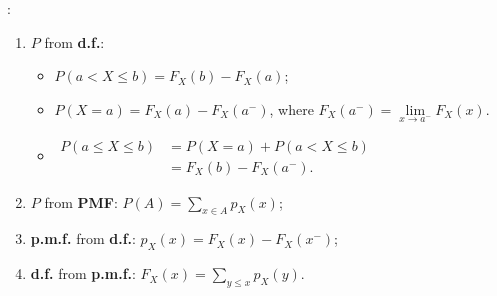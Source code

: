 :
\begin{enumerate}
  \item \(P\) from \textbf{d.f.}:
  \begin{itemize}
    \item \(P(a<X\leq b)=F_X(b) - F_X(a)\);
    \item \(P(X=a)=F_X(a)-F_X(a^-)\), where 
      \(F_X(a^-)=\lim\limits_{x\rightarrow a^-}F_X(x)\).
    \item \(\begin{aligned}
        P(a \leq X \leq b) &= P(X = a) + P(a < X \leq b) \\ &= F_X(b)-F_X(a^-).
    \end{aligned}\)
  \end{itemize}
  \item \(P\) from \textbf{PMF}: \(P(A) = \sum_{x\in A}p_X(x)\);
  \item \textbf{p.m.f.} from \textbf{d.f.}: \(p_X(x) = F_X(x) - F_X(x^-)\);
  \item \textbf{d.f.} from \textbf{p.m.f.}: \(F_X(x) = \sum_{y\leq x}p_X(y)\).
\end{enumerate}

